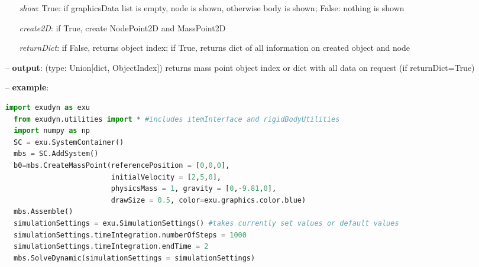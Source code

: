 \begin{itemize}[leftmargin=0.7cm]
\begin{itemize}[leftmargin=1.2cm]
\item[]{\it show}: True: if graphicsData list is empty, node is shown, otherwise body is shown; False: nothing is shown
\item[]{\it create2D}: if True, create NodePoint2D and MassPoint2D
\item[]{\it returnDict}: if False, returns object index; if True, returns dict of all information on created object and node
\end{itemize}
\item[--]
{\bf output}: (type: Union[dict, ObjectIndex]) returns mass point object index or dict with all data on request (if returnDict=True)
\item[--]
{\bf example}: \vspace{-12pt}\ei\begin{lstlisting}[language=Python, xleftmargin=36pt]
  import exudyn as exu
  from exudyn.utilities import * #includes itemInterface and rigidBodyUtilities
  import numpy as np
  SC = exu.SystemContainer()
  mbs = SC.AddSystem()
  b0=mbs.CreateMassPoint(referencePosition = [0,0,0],
                         initialVelocity = [2,5,0],
                         physicsMass = 1, gravity = [0,-9.81,0],
                         drawSize = 0.5, color=exu.graphics.color.blue)
  mbs.Assemble()
  simulationSettings = exu.SimulationSettings() #takes currently set values or default values
  simulationSettings.timeIntegration.numberOfSteps = 1000
  simulationSettings.timeIntegration.endTime = 2
  mbs.SolveDynamic(simulationSettings = simulationSettings)
\end{lstlisting}\vspace{-24pt}\bi\item[]\vspace{-24pt}\vspace{12pt}\end{itemize}
%

